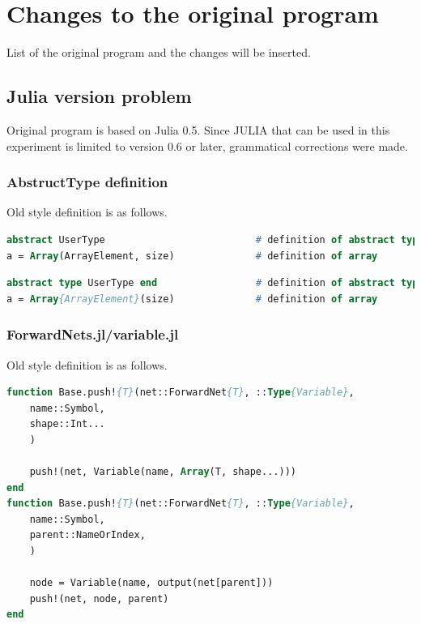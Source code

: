 \section{Changes to the original program}


List of the original program and the changes will be inserted.


\subsection{Julia version problem}

Original program is based on Julia 0.5. 
Since JULIA that can be used in this experiment is limited to version 0.6 or later, grammatical corrections were made.

\subsubsection{AbstructType definition}

Old style definition is as follows.

\begin{lstlisting}[caption=Julia old style definition ,label=list:julia_05_def, escapechar=!, language=Pascal, frame=single]
abstract UserType                          # definition of abstract type
a = Array(ArrayElement, size)              # definition of array
\end{lstlisting}



\begin{lstlisting}[caption=Julia 0.6 style ,label=list:julia_06_def, escapechar=!, language=Pascal, frame=single]
abstract type UserType end                 # definition of abstract type
a = Array{ArrayElement}(size)              # definition of array
\end{lstlisting}


\subsubsection{ForwardNets.jl/variable.jl}

Old style definition is as follows.

\begin{lstlisting}[caption=Julia old style definition 
,label=list:julia_05_forwardnets, language=Pascal, frame=single]
function Base.push!{T}(net::ForwardNet{T}, ::Type{Variable},
    name::Symbol,
    shape::Int...
    )

    push!(net, Variable(name, Array(T, shape...)))
end
function Base.push!{T}(net::ForwardNet{T}, ::Type{Variable},
    name::Symbol,
    parent::NameOrIndex,
    )

    node = Variable(name, output(net[parent]))
    push!(net, node, parent)
end
\end{lstlisting}

